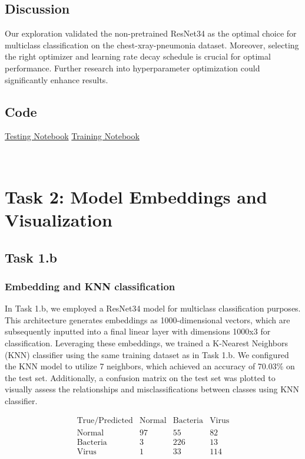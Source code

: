 \documentclass{article}
\begin{document}
\subsection{Discussion}
Our exploration validated the non-pretrained ResNet34 as the optimal choice for multiclass classification on the chest-xray-pneumonia dataset. Moreover, selecting the right optimizer and learning rate decay schedule is crucial for optimal performance. Further research into hyperparameter optimization could significantly enhance results.

\subsection{Code}

\href{https://colab.research.google.com/drive/1FQ7bfbL8da7DRQiRvmgwdZXTTDB8sq8w}{Testing Notebook}
\href{https://colab.research.google.com/drive/1Tn58ilSmOiaNIyFNw5BHlqye3YQIMplX#scrollTo=fSeq-k2n1jHI}{Training Notebook}


\
\section{Task 2: Model Embeddings and Visualization}
\subsection{Task 1.b}
\subsubsection{Embedding and KNN classification}
In Task 1.b, we employed a ResNet34 model for multiclass classification purposes. This architecture generates embeddings as 1000-dimensional vectors, which are subsequently inputted into a final linear layer with dimensions 1000x3 for classification. Leveraging these embeddings, we trained a K-Nearest Neighbors (KNN) classifier using the same training dataset as in Task 1.b. We configured the KNN model to utilize 7 neighbors, which achieved an accuracy of 70.03\% on the test set. Additionally, a confusion matrix on the test set was plotted to visually assess the relationships and misclassifications between classes using KNN classifier.


\[
\begin{array}{c|cccc}
\text{True/Predicted} & \text{Normal} & \text{Bacteria} & \text{Virus} \\
\hline
\text{Normal} & 97 & 55 & 82 \\
\text{Bacteria} & 3 & 226 & 13 \\
\text{Virus} & 1 & 33 & 114 \\
\end{array}
\]
\end{document}

